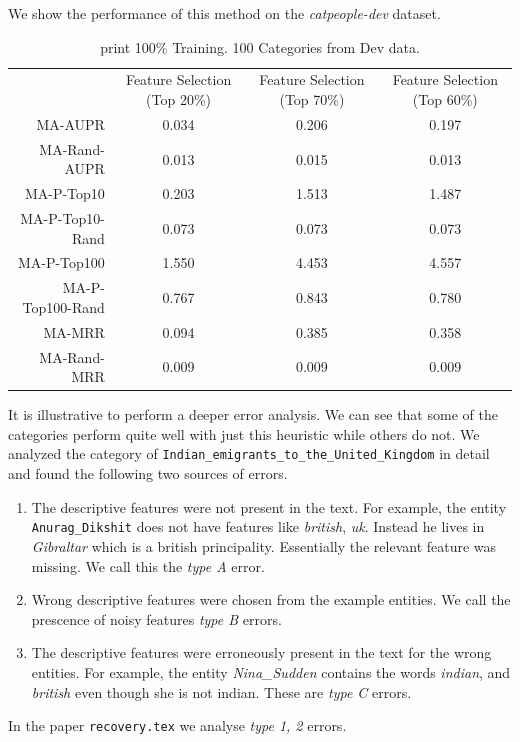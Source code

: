 \documentclass{article}
\begin{document}
We show the performance of this method on the
\textit{catpeople-dev} dataset.
\begin{table}[htbp]
  \centering
{}
  \begin{tabular}{r  c  c c }\toprule
                 & Feature Selection (Top 20\%) & Feature Selection (Top 70\%) & Feature Selection (Top 60\%) \\
MA-AUPR          & 0.034                        & 0.206                        & 0.197                        \\
MA-Rand-AUPR     & 0.013                        & 0.015                        & 0.013                        \\
MA-P-Top10       & 0.203                        & 1.513                        & 1.487                        \\
MA-P-Top10-Rand  & 0.073                        & 0.073                        & 0.073                        \\
MA-P-Top100      & 1.550                        & 4.453                        & 4.557                        \\
MA-P-Top100-Rand & 0.767                        & 0.843                        & 0.780                        \\
MA-MRR           & 0.094                        & 0.385                        & 0.358                        \\
MA-Rand-MRR      & 0.009                        & 0.009                        & 0.009                        \\
\bottomrule\end{tabular}
  \caption{print 100\% Training. 100 Categories from Dev data.}
  \label{tab:summary-nb}
\end{table}

It is illustrative to perform a deeper error analysis.
We can see that some of the categories perform quite well with just this
heuristic while others do not.
We analyzed the category of \verb|Indian_emigrants_to_the_United_Kingdom| in
detail and found the following two sources of errors.
\begin{enumerate}[label=(\Alph*)]
\item The descriptive features were not present in the text. For example, the
  entity \verb|Anurag_Dikshit| does not have features like \textit{british},
  \textit{uk}. Instead he lives in \textit{Gibraltar} which is a british
  principality. Essentially the relevant feature was missing.
  We call this the \textit{type A} error.
\item Wrong descriptive features were chosen from the example entities.
  We call the prescence of noisy features \textit{type B} errors.
\item The descriptive features were erroneously present in the text for the wrong
  entities. For example, the entity \textit{Nina\_Sudden} contains the words
  \textit{indian}, and \textit{british} even though she is not indian. These are
  \textit{type C} errors.
\end{enumerate}
In the paper \verb|recovery.tex| we analyse \textit{type 1, 2} errors.
\end{document}
